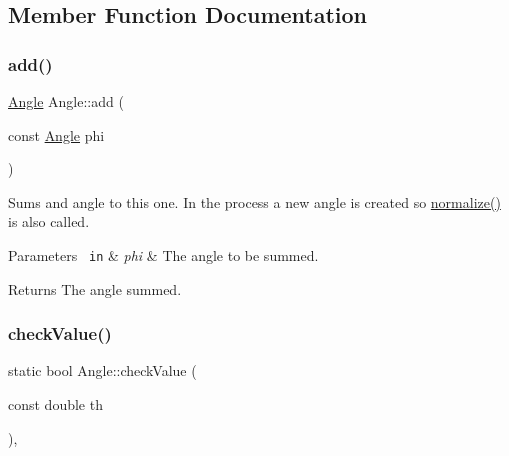 \subsection{Member Function Documentation}
\mbox{\label{class_angle_ab7279e3fb4ab12c334153f992ede0f1c}} 
\subsubsection{\texorpdfstring{add()}{add()}}
{\footnotesize\ttfamily \mbox{\hyperlink{class_angle}{Angle}} Angle\+::add (\begin{DoxyParamCaption}\item[{const \mbox{\hyperlink{class_angle}{Angle}}}]{phi }\end{DoxyParamCaption})\hspace{0.3cm}{\ttfamily [inline]}}



Sums and angle to this one. In the process a new angle is created so {\ttfamily \mbox{\hyperlink{class_angle_a449fc0638ca2e26b4a57d1cce95788e8}{normalize()}}} is also called. 


\begin{DoxyParams}[1]{Parameters}
\mbox{\texttt{ in}}  & {\em phi} & The angle to be summed. \\
\hline
\end{DoxyParams}
\begin{DoxyReturn}{Returns}
The angle summed. 
\end{DoxyReturn}
\mbox{\label{class_angle_a5a7714013699b70d5099bd40985288f1}} 
\subsubsection{\texorpdfstring{checkValue()}{checkValue()}}
{\footnotesize\ttfamily static bool Angle\+::check\+Value (\begin{DoxyParamCaption}\item[{const double}]{th }\end{DoxyParamCaption})\hspace{0.3cm}{\ttfamily [inline]}, {\ttfamily [static]}}

\mbox{\label{class_angle_ab1c34d25d3235e639313e5d48d98a6f6}} 
